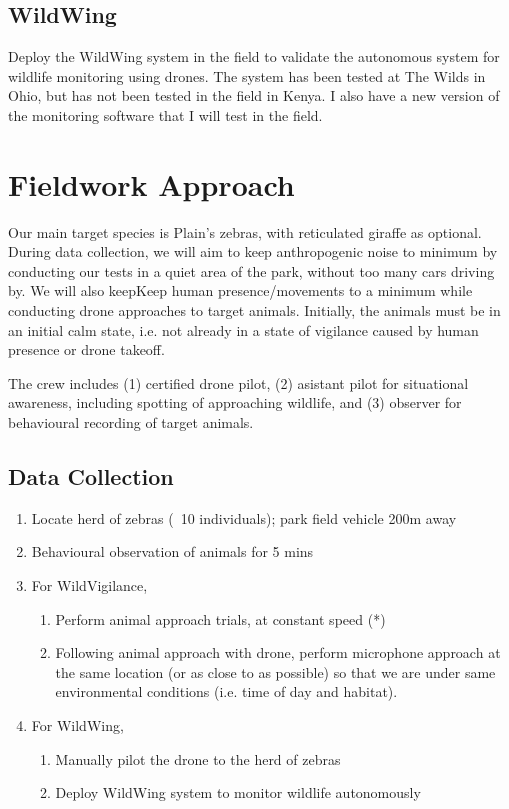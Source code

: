 \documentclass[final,5p,times,twocolumn]{elsarticle}
\begin{document}
\subsection{WildWing}
Deploy the WildWing system in the field to validate the autonomous system for wildlife monitoring using drones.
The system has been tested at The Wilds in Ohio, but has not been tested in the field in Kenya.
I also have a new version of the monitoring software that I will test in the field.


\section{Fieldwork Approach}
Our main target species is Plain’s zebras, with reticulated giraffe as optional. During data collection,  
we will aim to keep anthropogenic noise to minimum by conducting our tests in a quiet area of the park, without too many cars
driving by. We will also keepKeep human presence/movements to a minimum while conducting drone approaches to target
animals. Initially, the animals must be in an initial calm state, i.e. not already in a state of vigilance caused by
human presence or drone takeoff.

The crew includes (1) certified drone pilot, (2) asistant pilot for situational awareness, 
including spotting of approaching wildlife, and (3) observer for behavioural recording of target animals.

\subsection{Data Collection}
\begin{enumerate}
    \item Locate herd of zebras (~10 individuals); park field vehicle 200m away
    \item Behavioural observation of animals for 5 mins
    \item For WildVigilance,
    \begin{enumerate}
        \item Perform animal approach trials, at constant speed (*)
        \item Following animal approach with drone, perform microphone approach at the same location (or
        as close to as possible) so that we are under same environmental conditions (i.e. time of day and
        habitat).
    \end{enumerate}
    \item For WildWing,
    \begin{enumerate}
        \item Manually pilot the drone to the herd of zebras
        \item Deploy WildWing system to monitor wildlife autonomously
    \end{enumerate}
\end{enumerate}
\end{document}
